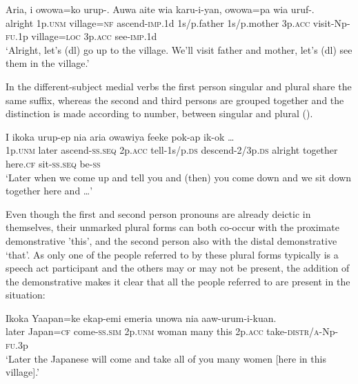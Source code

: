 \ea%
\label{ex:x1262}
\gll Aria,  i  owowa=ko  urup-.  Auwa  aite wia  karu-i-yan,  owowa=pa  wia  uruf-.\\
alright  1p.\textsc{unm}  village=\textsc{nf}  ascend-\textsc{imp}.1d  1s/p.father  1s/p.mother 3p.\textsc{acc}  visit-Np-\textsc{fu}.1p  village=\textsc{loc}  3p.\textsc{acc}  see-\textsc{imp}.1d\\
\glt `Alright, let's (dl) go up to the village. We'll visit father and mother, let's (dl) see them in the village.'
\z

In the different-subject medial verbs the first person singular and plural share the same suffix, whereas the second and third persons are grouped together and the distinction is made according to number, between singular and plural ().

\ea%
\label{ex:x1263}
\gll I  ikoka  urup-ep  nia     aria  owawiya  feeke  pok-ap  ik-ok  {\dots}\\
1p.\textsc{unm}  later  ascend-\textsc{ss}.\textsc{seq}  2p.\textsc{acc}  tell-1s/p.\textsc{ds} descend-2/3p.\textsc{ds}  alright  together  here.\textsc{cf}  sit-\textsc{ss}.\textsc{seq}  be-\textsc{ss}\\
\glt `Later when we come up and tell you and (then) you come down and we sit down together here and {\dots}'
\z

Even though the first and second person pronouns are already deictic in themselves, their unmarked plural forms can both co-occur with the proximate demonstrative  'this', 
and the second person also with the distal demonstrative  `that'. As only one of the people referred to by these plural forms typically is a speech act participant and the others may or may not be present, the addition of the demonstrative  makes it clear that all the people referred to are present in the situation: 

\ea%
\label{ex:x1269}
\gll Ikoka  Yaapan=ke  ekap-emi    emeria  unowa   nia  aaw-urum-i-kuan.\\
later  Japan=\textsc{cf}  come-\textsc{ss}.\textsc{sim}  2p.\textsc{unm}  woman  many  this 2p.\textsc{acc}  take-\textsc{distr}/\textsc{a}-Np-\textsc{fu}.3p\\
\glt `Later the Japanese will come and take all of you many women [here in this village].'
\z


